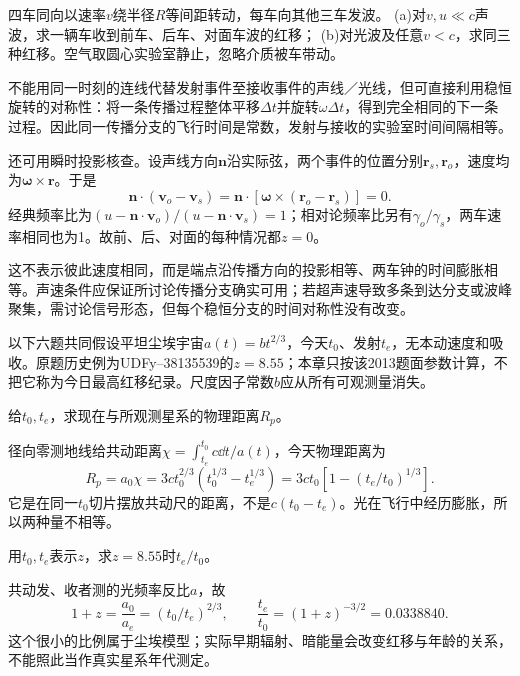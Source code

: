 \begin{exercise}
四车同向以速率$v$绕半径$R$等间距转动，每车向其他三车发波。
(a)对$v,u\ll c$声波，求一辆车收到前车、后车、对面车波的红移；
(b)对光波及任意$v<c$，求同三种红移。空气取圆心实验室静止，忽略介质被车带动。
\end{exercise}
\begin{solution}
不能用同一时刻的连线代替发射事件至接收事件的声线／光线，但可直接利用稳恒旋转的对称性：将一条传播过程整体平移$\Delta t$并旋转$\omega\Delta t$，得到完全相同的下一条过程。因此同一传播分支的飞行时间是常数，发射与接收的实验室时间间隔相等。

还可用瞬时投影核查。设声线方向$\boldsymbol n$沿实际弦，两个事件的位置分别$\boldsymbol r_s,\boldsymbol r_o$，速度均为$\boldsymbol\omega\times\boldsymbol r$。于是
\[
 \boldsymbol n\cdot(\boldsymbol v_o-\boldsymbol v_s)
 =\boldsymbol n\cdot[\boldsymbol\omega\times(\boldsymbol r_o-\boldsymbol r_s)]=0 .
\]
经典频率比为$(u-\boldsymbol n\cdot\boldsymbol v_o)/(u-\boldsymbol n\cdot\boldsymbol v_s)=1$；相对论频率比另有$\gamma_o/\gamma_s$，两车速率相同也为1。故前、后、对面的每种情况都$z=0$。

这不表示彼此速度相同，而是端点沿传播方向的投影相等、两车钟的时间膨胀相等。声速条件应保证所讨论传播分支确实可用；若超声速导致多条到达分支或波峰聚集，需讨论信号形态，但每个稳恒分支的时间对称性没有改变。
\end{solution}

以下六题共同假设平坦尘埃宇宙$a(t)=bt^{2/3}$，今天$t_0$、发射$t_e$，无本动速度和吸收。原题历史例为UDFy--38135539的$z=8.55$；本章只按该2013题面参数计算，不把它称为今日最高红移纪录。尺度因子常数$b$应从所有可观测量消失。

\begin{exercise}
给$t_0,t_e$，求现在与所观测星系的物理距离$R_p$。
\end{exercise}
\begin{solution}
径向零测地线给共动距离$\chi=\int_{t_e}^{t_0}c\dd t/a(t)$，今天物理距离为
\[
 R_p=a_0\chi
 =3ct_0^{2/3}(t_0^{1/3}-t_e^{1/3})
 =3ct_0[1-(t_e/t_0)^{1/3}].
\]
它是在同一$t_0$切片摆放共动尺的距离，不是$c(t_0-t_e)$。光在飞行中经历膨胀，所以两种量不相等。
\end{solution}

\begin{exercise}
用$t_0,t_e$表示$z$，求$z=8.55$时$t_e/t_0$。
\end{exercise}
\begin{solution}
共动发、收者测的光频率反比$a$，故
\[
 1+z=\frac{a_0}{a_e}=(t_0/t_e)^{2/3},\qquad
 \frac{t_e}{t_0}=(1+z)^{-3/2}=0.0338840.
\]
这个很小的比例属于尘埃模型；实际早期辐射、暗能量会改变红移与年龄的关系，不能照此当作真实星系年代测定。
\end{solution}


